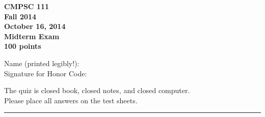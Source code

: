 \documentclass[11pt]{report}
\begin{document}
\thispagestyle{empty}
\begin{center}
\bf CMPSC 111\\
Fall 2014\\
October 16, 2014\\
Midterm Exam\\
100 points

\vspace{1in}
Name (printed legibly!): \underline{\hspace{3in}}\\

\bigskip
Signature for Honor Code: \underline{\hspace{3in}}\\
\end{center}

\medskip
\noindent
The quiz is closed book, closed notes, and closed computer. \\
Please place all answers on the test sheets. 

\begin{center}\rule{4in}{1pt} \end{center}
\end{document}
